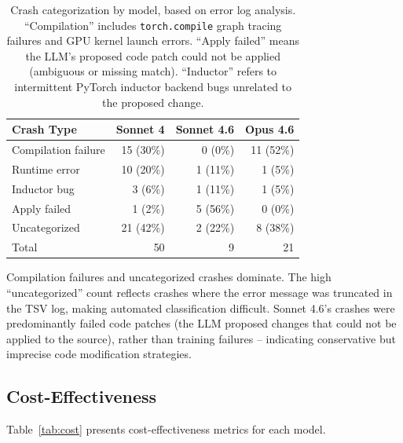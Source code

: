 \documentclass[11pt]{article}
\begin{document}
\begin{table}[H]
\centering
\caption{Crash categorization by model, based on error log analysis. ``Compilation'' includes \texttt{torch.compile} graph tracing failures and GPU kernel launch errors. ``Apply failed'' means the LLM's proposed code patch could not be applied (ambiguous or missing match). ``Inductor'' refers to intermittent PyTorch inductor backend bugs unrelated to the proposed change.}
\label{tab:crash_categories}
\begin{tabular}{lrrr}
\toprule
\textbf{Crash Type} & \textbf{Sonnet 4} & \textbf{Sonnet 4.6} & \textbf{Opus 4.6} \\
\midrule
Compilation failure  & 15 (30\%) & 0 (0\%)   & 11 (52\%) \\
Runtime error        & 10 (20\%) & 1 (11\%)  & 1 (5\%)   \\
Inductor bug         & 3 (6\%)   & 1 (11\%)  & 1 (5\%)   \\
Apply failed         & 1 (2\%)   & 5 (56\%)  & 0 (0\%)   \\
Uncategorized        & 21 (42\%) & 2 (22\%)  & 8 (38\%)  \\
\midrule
Total                & 50        & 9         & 21        \\
\bottomrule
\end{tabular}
\end{table}

Compilation failures and uncategorized crashes dominate. The high ``uncategorized'' count reflects crashes where the error message was truncated in the TSV log, making automated classification difficult. Sonnet 4.6's crashes were predominantly failed code patches (the LLM proposed changes that could not be applied to the source), rather than training failures -- indicating conservative but imprecise code modification strategies.

\subsection{Cost-Effectiveness}
\label{sec:cost}

Table~\ref{tab:cost} presents cost-effectiveness metrics for each model.
\end{document}
